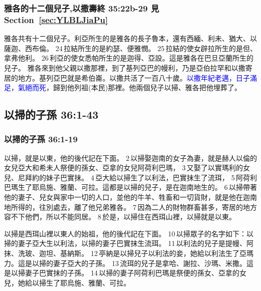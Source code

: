 \subsubsection{雅各的十二個兒子,以撒壽終 35:22b-29 見Section~\ref{sec:YLBLJiaPu}}
雅各共有十二個兒子。利亞所生的是雅各的長子魯本，還有西緬、利未、猶大、以薩迦、西布倫。 24 拉結所生的是約瑟、便雅憫。 25 拉結的使女辟拉所生的是但、拿弗他利。 26 利亞的使女悉帕所生的是迦得、亞設。這是雅各在巴旦亞蘭所生的兒子。
雅各來到他父親以撒那裡，到了基列亞巴的幔利，乃是亞伯拉罕和以撒寄居的地方。基列亞巴就是希伯崙。以撒共活了一百八十歲。\textcolor{blue}{以撒年紀老邁，日子滿足，氣絕而死}，歸到他列祖(本民)那裡。他兩個兒子以掃、雅各把他埋葬了。



\subsection{以掃的子孫 36:1-43}
\subsubsection{以掃的子孫 36:1-19 }
以掃，就是以東，他的後代記在下面。 2 以掃娶迦南的女子為妻，就是赫人以倫的女兒亞大和希未人祭便的孫女、亞拿的女兒阿荷利巴瑪， 3 又娶了以實瑪利的女兒、尼拜約的妹子巴實抹。 4 亞大給以掃生了以利法，巴實抹生了流珥， 5 阿荷利巴瑪生了耶烏施、雅蘭、可拉。這都是以掃的兒子，是在迦南地生的。 6 以掃帶著他的妻子、兒女與家中一切的人口，並他的牛羊、牲畜和一切貨財，就是他在迦南地所得的，往別處去，離了他兄弟雅各。 7 因為二人的財物群畜甚多，寄居的地方容不下他們，所以不能同居。 8 於是，以掃住在西珥山裡，以掃就是以東。

以掃是西珥山裡以東人的始祖，他的後代記在下面。 10 以掃眾子的名字如下：以掃的妻子亞大生以利法，以掃的妻子巴實抹生流珥。 11 以利法的兒子是提幔、阿抹、洗玻、迦坦、基納斯。 12 亭納是以掃兒子以利法的妾，她給以利法生了亞瑪力。這是以掃的妻子亞大的子孫。 13 流珥的兒子是拿哈、謝拉、沙瑪、米撒。這是以掃妻子巴實抹的子孫。 14 以掃的妻子阿荷利巴瑪是祭便的孫女、亞拿的女兒，她給以掃生了耶烏施、雅蘭、可拉。

